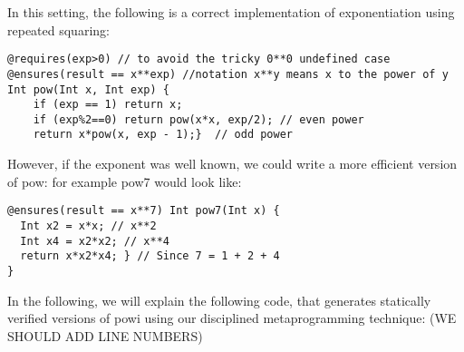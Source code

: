In this setting, the following is a correct implementation of exponentiation using repeated squaring:
\begin{lstlisting}
@requires(exp>0) // to avoid the tricky 0**0 undefined case
@ensures(result == x**exp) //notation x**y means x to the power of y
Int pow(Int x, Int exp) {
	if (exp == 1) return x;
	if (exp%2==0) return pow(x*x, exp/2); // even power
	return x*pow(x, exp - 1);}  // odd power
\end{lstlisting}
However, if the exponent was well known, we could write a more efficient version of pow: for example pow7 would look like:
\begin{lstlisting}
@ensures(result == x**7) Int pow7(Int x) { 
  Int x2 = x*x; // x**2
  Int x4 = x2*x2; // x**4
  return x*x2*x4; } // Since 7 = 1 + 2 + 4
}
\end{lstlisting}
In the following, we will explain the following 
code, that generates statically verified versions of powi using our disciplined metaprogramming technique:
(WE SHOULD ADD LINE NUMBERS)

%
%

